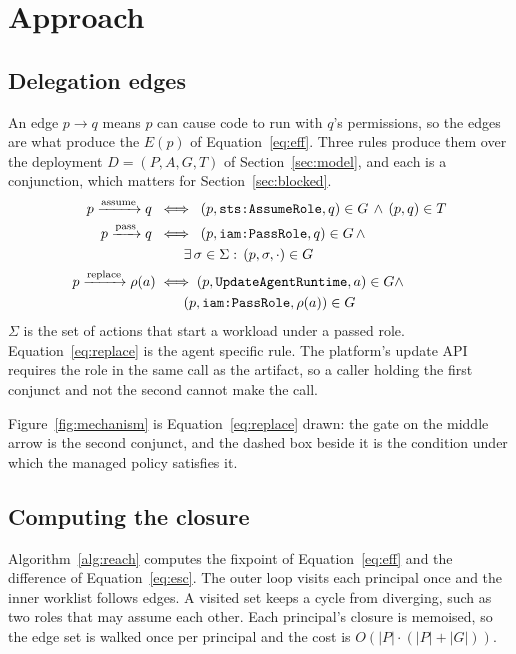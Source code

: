 \section{Approach}
\label{sec:approach}

\subsection{Delegation edges}

An edge $p \rightarrow q$ means $p$ can cause code to run with $q$'s
permissions, so the edges are what produce the $E(p)$ of
Equation~\ref{eq:eff}. Three rules produce them over the deployment
$D = (P, A, G, T)$ of Section~\ref{sec:model}, and each is a conjunction,
which matters for Section~\ref{sec:blocked}.
%
\begin{align}
\label{eq:assume}
p \xrightarrow{\text{assume}} q \;&\iff\;
  (p, \texttt{sts:AssumeRole}, q) \in G \,\wedge\, (p,q) \in T \\
\label{eq:pass}
p \xrightarrow{\text{pass}} q \;&\iff\;
  (p, \texttt{iam:PassRole}, q) \in G \,\wedge\, \nonumber\\
  &\qquad \exists\, \sigma \in \Sigma :\, (p, \sigma, \cdot) \in G \\
\label{eq:replace}
p \xrightarrow{\text{replace}} \rho(a) &\iff
  (p, \texttt{UpdateAgentRuntime}, a) \in G \wedge \nonumber\\
  &\qquad (p, \texttt{iam:PassRole}, \rho(a)) \in G
\end{align}
%
$\Sigma$ is the set of actions that start a workload under a passed role.
Equation~\ref{eq:replace} is the agent specific rule. The platform's update
API requires the role in the same call as the artifact, so a caller holding the
first conjunct and not the second cannot make the call.

Figure~\ref{fig:mechanism} is Equation~\ref{eq:replace} drawn: the gate on the
middle arrow is the second conjunct, and the dashed box beside it is the
condition under which the managed policy satisfies it.

\subsection{Computing the closure}

Algorithm~\ref{alg:reach} computes the fixpoint of Equation~\ref{eq:eff} and
the difference of Equation~\ref{eq:esc}. The outer loop visits each principal
once and the inner worklist follows edges. A visited set keeps a cycle from
diverging, such as two roles that may assume each other. Each principal's
closure is memoised, so the edge set is walked once per principal and the cost
is $O(|P| \cdot (|P| + |G|))$.


